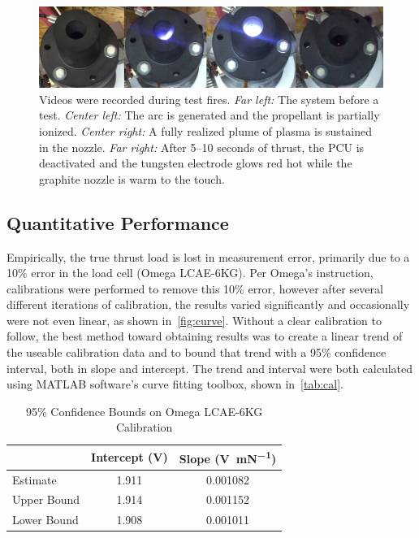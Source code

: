 \documentclass[journal]{IEEEtran}
\begin{document}
\begin{figure}
  \includegraphics[width=\linewidth]{figs/burnsnapshots.png}
  \caption{Videos were recorded during test fires.
  \emph{Far left:} The system before a test.
  \emph{Center left:} The arc is generated and the propellant is partially ionized.
  \emph{Center right:} A fully realized plume of plasma is sustained in the nozzle.
  \emph{Far right:} After 5--10 seconds of thrust, the PCU is deactivated and the tungsten electrode glows red hot while the graphite nozzle is warm to the touch.
\label{fig:burn-snapshots}}
\end{figure}

\subsection{Quantitative Performance}
Empirically, the true thrust load is lost in measurement error, primarily due to a 10\% error in the load cell (Omega LCAE-6KG).
Per Omega's instruction, calibrations were performed to remove this 10\% error, however after several different iterations of calibration, the results varied significantly and occasionally were not even linear, as shown in~\autoref{fig:curve}.
Without a clear calibration to follow, the best method toward obtaining results was to create a linear trend of the useable calibration data and to bound that trend with a 95\% confidence interval, both in slope and intercept.
The trend and interval were both calculated using MATLAB software's curve fitting toolbox, shown in~\autoref{tab:cal}.

\begin{table}
  \centering
  \caption{95\% Confidence Bounds on Omega LCAE-6KG Calibration
\label{tab:cal}}
  \begin{tabular}{lcc}
    \toprule
    & Intercept (\si{\volt}) & Slope (\si{\volt\per\milli\newton}) \\ \midrule
    Estimate & 1.911 & 0.001082 \\
    Upper Bound & 1.914 & 0.001152 \\
    Lower Bound & 1.908 & 0.001011 \\
    \bottomrule
  \end{tabular}
\end{table}
\end{document}
